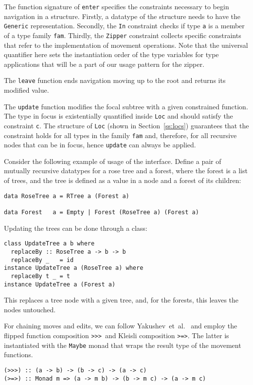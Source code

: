 \documentclass[runningheads]{llncs}
\newcommand{\K}[1]{\lstinline[style=fancy]{#1}}
\begin{document}
The function signature of \K{enter} specifies the constraints necessary to begin navigation in a structure. Firstly, a datatype of the structure needs to have the \K{Generic} representation. Secondly, the \K{In} constraint checks if type \K{a} is a member of a type family \K{fam}. Thirdly, the \K{Zipper} constraint collects specific constraints that refer to the implementation of movement operations. Note that the universal quantifier here sets the instantiation order of the type variables for type applications that will be a part of our usage pattern for the zipper. 

The \K{leave} function ends navigation moving up to the root and returns its modified value. 

The \K{update} function modifies the focal subtree with a given constrained function. The type in focus is existentially quantified inside \K{Loc} and should satisfy the constraint \K{c}. The structure of \K{Loc} (shown in Section~\ref{ss:locs}) guarantees that the constraint holds for all types in the family \K{fam} and, therefore, for all recursive nodes that can be in focus, hence \K{update} can always be applied.

Consider the following example of usage of the interface. Define a pair of mutually recursive datatypes for a rose tree and a forest, where the forest is a list of trees, and the tree is defined as a value in a node and a forest of its children:
\begin{lstlisting}[style=fancy]
data RoseTree a = RTree a (Forest a)

data Forest   a = Empty | Forest (RoseTree a) (Forest a)
\end{lstlisting}

Updating the trees can be done through a class:
\begin{lstlisting}[style=fancy]
class UpdateTree a b where
  replaceBy :: RoseTree a -> b -> b
  replaceBy _   = id
instance UpdateTree a (RoseTree a) where
  replaceBy t _ = t
instance UpdateTree a (Forest a)
\end{lstlisting}
This replaces a tree node with a given tree, and, for the forests, this leaves the nodes untouched.

For chaining moves and edits, we can follow Yakushev~et~al.~\cite{MuRec2009} and employ  the flipped function composition \K{>>>}~and Kleisli composition \K{>=>}. The latter is instantiated with the \K{Maybe} monad that wraps the result type of the movement functions.
\begin{lstlisting}[style=fancy]
(>>>) :: (a -> b) -> (b -> c) -> (a -> c)
(>=>) :: Monad m => (a -> m b) -> (b -> m c) -> (a -> m c)
\end{lstlisting}
\end{document}
